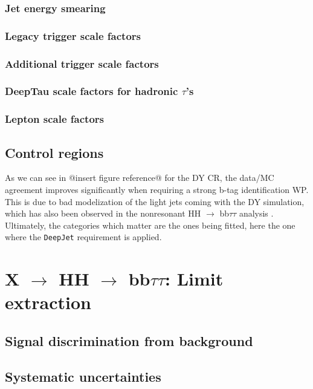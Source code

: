 \documentclass[11pt]{article}
\newcommand{\bbtt}{HH $\rightarrow$ bb$\tau\tau$}
\newcommand{\reshhbbtt}{X $\rightarrow$ HH $\rightarrow$ bb$\tau\tau$}
\begin{document}
\subsubsection{Jet energy smearing}
\label{sec:org3a3bf34}
\subsubsection{Legacy trigger scale factors}
\label{sec:orgdd51202}
\subsubsection{Additional trigger scale factors}
\label{sec:org34b0224}
\subsubsection{DeepTau scale factors for hadronic \(\tau\)'s}
\label{sec:org2b1ea98}
\subsubsection{Lepton scale factors}
\label{sec:org067b2b1}

\subsection{Control regions}
\label{sec:orga5cb467}
As we can see in @insert figure reference@ for the \ac{DY} \ac{CR}, the data/MC agreement improves significantly when requiring a strong b-tag identification \ac{WP}.
This is due to bad modelization of the light jets coming with the \ac{DY} simulation, which has also been observed in the nonresonant \bbtt{} analysis \cite{higgs_bbtautau_nonres}.
Ultimately, the categories which matter are the ones being fitted, here the one where the \texttt{DeepJet} requirement is applied.


\section{\reshhbbtt{}: Limit extraction}
\label{sec:orgd9768eb}
\subsection{Signal discrimination from background}
\label{sec:org91a0b15}
\subsection{Systematic uncertainties}
\label{sec:orgfed3a74}
\end{document}
